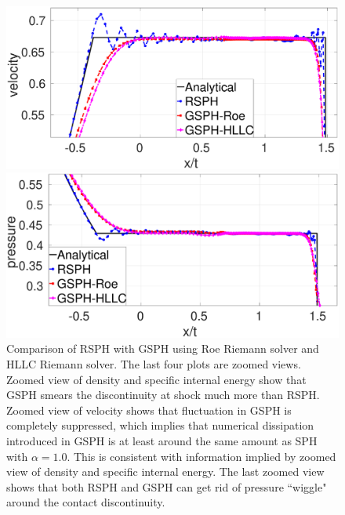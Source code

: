 \begin{figure}[htp]
\begin{minipage}{.495 \textwidth}
    \end{minipage}%
    \\
    \begin{minipage}{.495 \textwidth}
        \centering
        \includegraphics[width=0.99 \textwidth]{Chapter-4/Figures/Sod/RCM-Sod-GSPH-compare-v-zoom}
    \end{minipage}%
    \begin{minipage}{.495\textwidth}
        \centering
        \includegraphics[width=0.99 \textwidth]{Chapter-4/Figures/Sod/RCM-Sod-GSPH-compare-p-zoom}
    \end{minipage}%
    \caption{Comparison of RSPH with GSPH using Roe Riemann solver and HLLC Riemann solver. The last four plots are zoomed views. Zoomed view of density and specific internal energy show that GSPH smears the discontinuity at shock much more than RSPH. Zoomed view of velocity shows that fluctuation in GSPH is completely suppressed, which implies that numerical dissipation introduced in GSPH is at least around the same amount as SPH with $\alpha=1.0$. This is consistent with information implied by zoomed view of density and specific internal energy. The last zoomed view shows that both RSPH and GSPH can get rid of pressure ``wiggle" around the contact discontinuity.}
    \label{fig:RCM-Sod-GSPH}
\end{figure}

